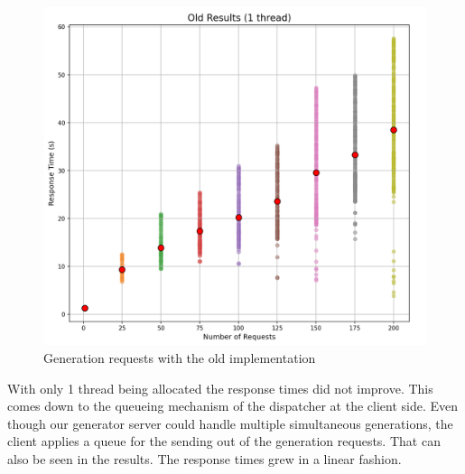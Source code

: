 			\begin{figure}[h!] 
				\begin{center}
					\includegraphics[scale=0.6]{include/imgs/1thread_old.PNG}
					\caption{Generation requests with the old implementation}
					\label{1threadold}
				\end{center}
			\end{figure}

			With only 1 thread being allocated the response times did not improve. This comes down to the queueing mechanism of the dispatcher at the client side.
			Even though our generator server could handle multiple simultaneous generations, the client applies a queue for the sending out of the generation requests.
			That can also be seen in the results. The response times grew in a linear fashion.

